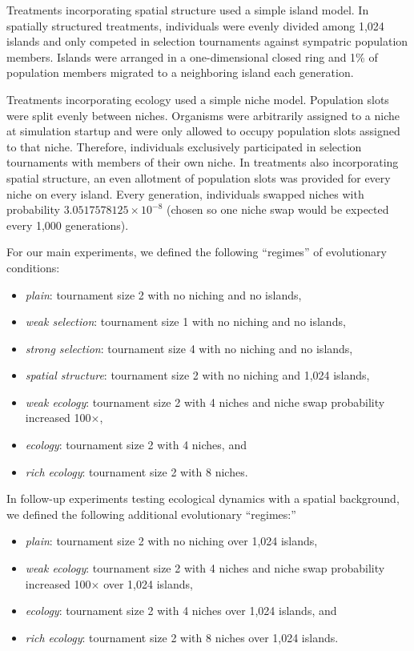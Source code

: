 Treatments incorporating spatial structure used a simple island model.
In spatially structured treatments, individuals were evenly divided among 1,024 islands and only competed in selection tournaments against sympatric population members.
Islands were arranged in a one-dimensional closed ring and 1\% of population members migrated to a neighboring island each generation.

Treatments incorporating ecology used a simple niche model.
Population slots were split evenly between niches.
Organisms were arbitrarily assigned to a niche at simulation startup and were only allowed to occupy population slots assigned to that niche.
Therefore, individuals exclusively participated in selection tournaments with members of their own niche.
In treatments also incorporating spatial structure, an even allotment of population slots was provided for every niche on every island.
Every generation, individuals swapped niches with probability $3.0517578125 \times 10^{-8}$ (chosen so one niche swap would be expected every 1,000 generations).

For our main experiments, we defined the following ``regimes'' of evolutionary conditions:
\begin{itemize}
  \item \textit{plain}: tournament size 2 with no niching and no islands,
  \item \textit{weak selection}: tournament size 1 with no niching and no islands,
  \item \textit{strong selection}: tournament size 4 with no niching and no islands,
  \item \textit{spatial structure}: tournament size 2 with no niching and 1,024 islands,
  \item \textit{weak ecology}: tournament size 2 with 4 niches and niche swap probability increased 100$\times$,
  \item \textit{ecology}: tournament size 2 with 4 niches, and
  \item \textit{rich ecology}: tournament size 2 with 8 niches.
\end{itemize}

In follow-up experiments testing ecological dynamics with a spatial background, we defined the following additional evolutionary ``regimes:''
\begin{itemize}
  \item \textit{plain}: tournament size 2 with no niching over 1,024 islands,
  \item \textit{weak ecology}: tournament size 2 with 4 niches and niche swap probability increased 100$\times$ over 1,024 islands,
  \item \textit{ecology}: tournament size 2 with 4 niches over 1,024 islands, and
  \item \textit{rich ecology}: tournament size 2 with 8 niches over 1,024 islands.
\end{itemize}

